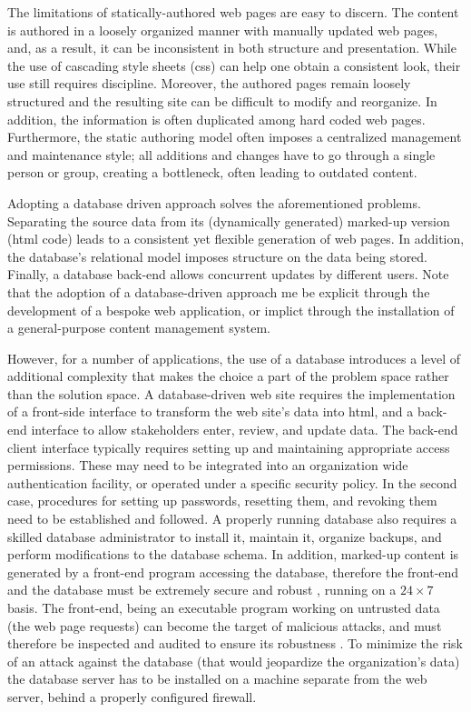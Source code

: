 \documentclass{article}
\begin{document}
The limitations of statically-authored web pages are easy to discern.
The content is authored in a loosely organized manner with
manually updated web pages, and, as a result,
it can be inconsistent in both structure and presentation.
While the use of cascading style sheets ({\sc css}) can help one obtain a
consistent look, their use still requires discipline.
Moreover, the authored pages remain loosely structured and the resulting
site can be difficult to modify and reorganize. In addition, the information is often duplicated
among hard coded web pages.
Furthermore, the static authoring model often imposes a centralized
management and maintenance style;
all additions and changes have to go through a single person or group,
creating a bottleneck, often leading to outdated content.

Adopting a database driven approach solves
the aforementioned problems.
Separating the source data from its (dynamically generated)
marked-up version ({\sc html} code) leads to a consistent
yet flexible generation of web pages.
In addition, the database's relational model imposes
structure on the data being stored.
Finally, a database back-end allows concurrent updates by
different users.
Note that the adoption of a database-driven approach me be
explicit through the development of a bespoke web application,
or implict through the installation of a general-purpose content
management system.


However, for a number of applications, the use of a database
introduces a level of additional complexity that
makes the choice a part of
the problem space rather than the solution space.
A database-driven web site requires the implementation of a
front-side interface to transform the web site's data into
{\sc html}, and a back-end interface to allow stakeholders
enter, review, and update data.
The back-end client interface typically requires setting up
and maintaining appropriate access permissions.
These may need to be integrated into an organization wide authentication 
facility, or operated under a specific security policy.
In the second case, procedures for setting up passwords,
resetting them, and revoking them need to be established and followed.
A properly running database also requires a skilled database
administrator to install it, maintain it, organize backups,
and perform modifications to the database schema.
In addition, marked-up content is generated by a front-end
program accessing the database, therefore the front-end and the database
must be extremely secure and robust \cite{VG01}, running on a $24 \times 7$ basis.
The front-end, being an executable program working on
untrusted data (the web page requests) can become the target of
malicious attacks,
and must therefore be inspected and audited to ensure its robustness \cite{YHDM04}.
To minimize the risk of an attack against the database
(that would jeopardize the organization's data)
the database server has to be installed on a machine separate
from the web server, behind a properly configured firewall.
\end{document}
